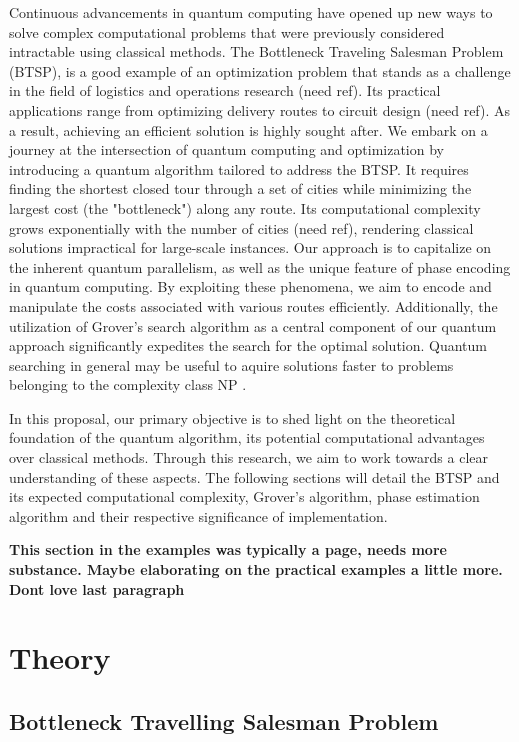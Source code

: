 \documentclass[twocolumn,showpacs,preprintnumbers,amsmath,amssymb]{revtex4}
\begin{document}
		
		Continuous advancements in quantum computing have opened up new ways to solve complex computational problems that were previously considered intractable using classical methods. The Bottleneck Traveling Salesman Problem (BTSP), is a good example of an optimization problem that stands as a challenge in the field of logistics and operations research (need ref). Its practical applications range from optimizing delivery routes to circuit design (need ref). As a result, achieving an efficient solution is highly sought after. We embark on a journey at the intersection of quantum computing and optimization by introducing a quantum algorithm tailored to address the BTSP. It requires finding the shortest closed tour through a set of cities while minimizing the largest cost (the "bottleneck") along any route. Its computational complexity grows exponentially with the number of cities (need ref), rendering classical solutions impractical for large-scale instances. Our approach is to capitalize on the inherent quantum parallelism, as well as the unique feature of phase encoding in quantum computing. By exploiting these phenomena, we aim to encode and manipulate the costs associated with various routes efficiently. Additionally, the utilization of Grover's search algorithm as a central component of our quantum approach significantly expedites the search for the optimal solution.  Quantum searching in general may be useful to aquire solutions faster to problems belonging to the complexity class NP \cite{nielsen00}.
		
		
		In this proposal, our primary objective is to shed light on the theoretical foundation of the quantum algorithm, its potential computational advantages over classical methods. Through this research, we aim to work towards a clear understanding of these aspects. The following sections will detail the BTSP and its expected computational complexity,  Grover's algorithm, phase estimation algorithm and their respective significance of implementation.
		
		\textbf{This section in the examples was typically a page, needs more substance. Maybe elaborating on the practical examples a little more. Dont love last paragraph} 
		
		
		\section{Theory}
		
		\subsection{Bottleneck Travelling Salesman Problem}
		
\end{document}
